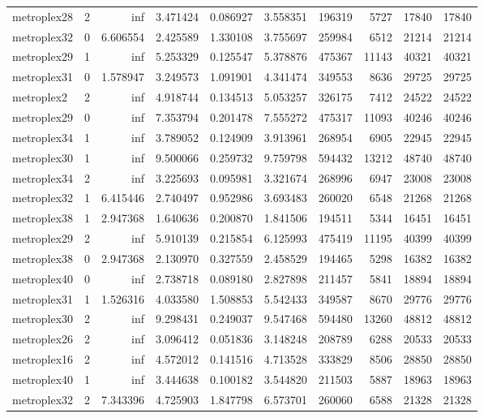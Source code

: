 \begin{longtable}{|l|r|r|r|r|r|r|r|r|r|}
metroplex28 & 2 & inf & 3.471424 & 0.086927 & 3.558351 & 196319 & 5727 & 17840 & 17840 \\
metroplex32 & 0 & 6.606554 & 2.425589 & 1.330108 & 3.755697 & 259984 & 6512 & 21214 & 21214 \\
metroplex29 & 1 & inf & 5.253329 & 0.125547 & 5.378876 & 475367 & 11143 & 40321 & 40321 \\
metroplex31 & 0 & 1.578947 & 3.249573 & 1.091901 & 4.341474 & 349553 & 8636 & 29725 & 29725 \\
metroplex2 & 2 & inf & 4.918744 & 0.134513 & 5.053257 & 326175 & 7412 & 24522 & 24522 \\
metroplex29 & 0 & inf & 7.353794 & 0.201478 & 7.555272 & 475317 & 11093 & 40246 & 40246 \\
metroplex34 & 1 & inf & 3.789052 & 0.124909 & 3.913961 & 268954 & 6905 & 22945 & 22945 \\
metroplex30 & 1 & inf & 9.500066 & 0.259732 & 9.759798 & 594432 & 13212 & 48740 & 48740 \\
metroplex34 & 2 & inf & 3.225693 & 0.095981 & 3.321674 & 268996 & 6947 & 23008 & 23008 \\
metroplex32 & 1 & 6.415446 & 2.740497 & 0.952986 & 3.693483 & 260020 & 6548 & 21268 & 21268 \\
metroplex38 & 1 & 2.947368 & 1.640636 & 0.200870 & 1.841506 & 194511 & 5344 & 16451 & 16451 \\
metroplex29 & 2 & inf & 5.910139 & 0.215854 & 6.125993 & 475419 & 11195 & 40399 & 40399 \\
metroplex38 & 0 & 2.947368 & 2.130970 & 0.327559 & 2.458529 & 194465 & 5298 & 16382 & 16382 \\
metroplex40 & 0 & inf & 2.738718 & 0.089180 & 2.827898 & 211457 & 5841 & 18894 & 18894 \\
metroplex31 & 1 & 1.526316 & 4.033580 & 1.508853 & 5.542433 & 349587 & 8670 & 29776 & 29776 \\
metroplex30 & 2 & inf & 9.298431 & 0.249037 & 9.547468 & 594480 & 13260 & 48812 & 48812 \\
metroplex26 & 2 & inf & 3.096412 & 0.051836 & 3.148248 & 208789 & 6288 & 20533 & 20533 \\
metroplex16 & 2 & inf & 4.572012 & 0.141516 & 4.713528 & 333829 & 8506 & 28850 & 28850 \\
metroplex40 & 1 & inf & 3.444638 & 0.100182 & 3.544820 & 211503 & 5887 & 18963 & 18963 \\
metroplex32 & 2 & 7.343396 & 4.725903 & 1.847798 & 6.573701 & 260060 & 6588 & 21328 & 21328 \\

\end{longtable}
